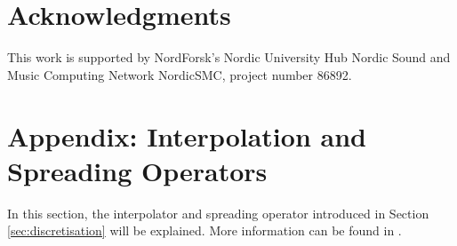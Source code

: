 \documentclass[twoside,a4paper,dvipsnames]{article}
\begin{document}
\section{Acknowledgments}
This work is supported by NordForsk's Nordic
University Hub Nordic Sound and Music Computing Network
NordicSMC, project number 86892.

\nocite{*}
\begin{footnotesize}

 
\end{footnotesize}

\section{Appendix: Interpolation and Spreading Operators}
\label{app:interpol}
In this section, the interpolator and spreading operator introduced in Section \ref{sec:discretisation} will be explained. More information can be found in \cite{Bilbao2009}.
\end{document}
